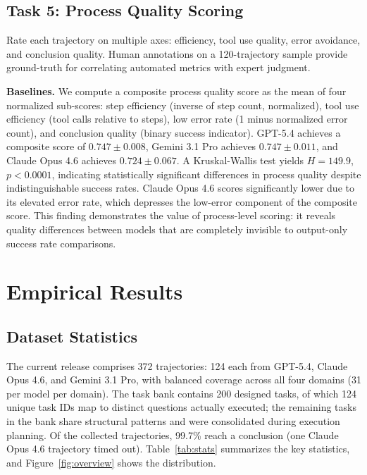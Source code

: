 \documentclass{article}
\newcommand{\ntrajectories}{372\xspace}
\newcommand{\ntasks}{200\xspace}
\newcommand{\nexecuted}{124\xspace}
\begin{document}
\subsection{Task 5: Process Quality Scoring}
\label{sec:task5}

Rate each trajectory on multiple axes: efficiency, tool use quality, error avoidance, and conclusion quality. Human annotations on a 120-trajectory sample provide ground-truth for correlating automated metrics with expert judgment.

\textbf{Baselines.} We compute a composite process quality score as the mean of four normalized sub-scores: step efficiency (inverse of step count, normalized), tool use efficiency (tool calls relative to steps), low error rate (1 minus normalized error count), and conclusion quality (binary success indicator). GPT-5.4 achieves a composite score of $0.747 \pm 0.008$, Gemini 3.1 Pro achieves $0.747 \pm 0.011$, and Claude Opus 4.6 achieves $0.724 \pm 0.067$. A Kruskal-Wallis test yields $H=149.9$, $p<0.0001$, indicating statistically significant differences in process quality despite indistinguishable success rates. Claude Opus 4.6 scores significantly lower due to its elevated error rate, which depresses the low-error component of the composite score. This finding demonstrates the value of process-level scoring: it reveals quality differences between models that are completely invisible to output-only success rate comparisons.

\section{Empirical Results}
\label{sec:results}

\subsection{Dataset Statistics}
\label{sec:stats}

The current release comprises \ntrajectories trajectories: 124 each from GPT-5.4, Claude Opus 4.6, and Gemini 3.1 Pro, with balanced coverage across all four domains (31 per model per domain). The task bank contains \ntasks designed tasks, of which \nexecuted unique task IDs map to distinct questions actually executed; the remaining tasks in the bank share structural patterns and were consolidated during execution planning. Of the collected trajectories, 99.7\% reach a conclusion (one Claude Opus 4.6 trajectory timed out). Table~\ref{tab:stats} summarizes the key statistics, and Figure~\ref{fig:overview} shows the distribution.
\end{document}
